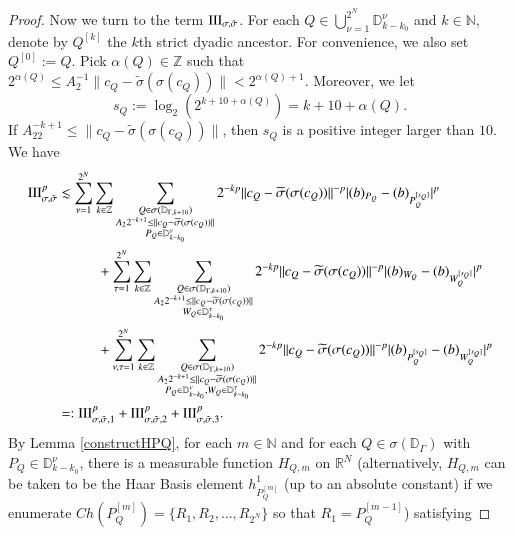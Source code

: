 \documentclass[12pt]{amsart}
\begin{document}
\begin{proof}
Now we turn to the term ${\rm III}_{\sigma,\tilde{\sigma}}$. For each ${\displaystyle Q\in \bigcup_{\nu=1}^{2^N}\mathbb{D}_{k-k_0}^\nu}$ and $k\in\mathbb{N}$, denote by $Q^{[k]}$ the $k$th strict dyadic ancestor. For convenience, we also set $Q^{[0]}:=Q$.  Pick $\alpha(Q)\in\mathbb{Z}$ such that
$2^{\alpha(Q)}\leq A_2^{-1}\|c_Q-\widetilde{\sigma}(\sigma(c_Q))\|<2^{\alpha(Q)+1}.$ Moreover, we let
$$s_Q:=\log_2(2^{k+10+\alpha(Q)})=k+10+\alpha(Q).$$
If $A_22^{-k+1}\leq \|c_Q-\widetilde{\sigma}(\sigma(c_Q))\|$, then $s_Q$ is a positive integer larger than $10$. We have
\begin{align*}
{\rm III}_{\sigma,\tilde{\sigma}}^p
&\lesssim \sum_{\nu=1}^{2^N}\sum_{k\in\mathbb{Z}}\sum_{\substack{Q\in\sigma(\mathbb{D}_{\Gamma,k+10})\nonumber\\ A_22^{-k+1}\leq \|c_Q-\widetilde{\sigma}(\sigma(c_Q))\|\\ P_Q\in\mathbb{D}_{k-k_0}^\nu}}2^{-kp}\|c_Q-\widetilde{\sigma}(\sigma(c_Q))\|^{-p}|(b)_{P_Q}-(b)_{P_Q^{[s_Q]}}|^p\nonumber\\
&\hspace{1.0cm}+ \sum_{\tau=1}^{2^N}\sum_{k\in\mathbb{Z}}\sum_{\substack{Q\in\sigma(\mathbb{D}_{\Gamma,k+10})\nonumber\\ A_22^{-k+1}\leq \|c_Q-\widetilde{\sigma}(\sigma(c_Q))\|\\ W_Q\in\mathbb{D}_{k-k_0}^\tau}}2^{-kp}\|c_Q-\widetilde{\sigma}(\sigma(c_Q))\|^{-p}|(b)_{W_Q}-(b)_{W_Q^{[s_Q]}}|^p\nonumber\\
&\hspace{1.0cm}+\sum_{\nu,\tau=1}^{2^N}\sum_{k\in\mathbb{Z}}\sum_{\substack{Q\in\sigma(\mathbb{D}_{\Gamma,k+10})\nonumber\\ A_22^{-k+1}\leq \|c_Q-\widetilde{\sigma}(\sigma(c_Q))\|\\ P_Q\in\mathbb{D}_{k-k_0}^\nu,W_Q\in\mathbb{D}_{k-k_0}^\tau }}2^{-kp}\|c_Q-\widetilde{\sigma}(\sigma(c_Q))\|^{-p}|(b)_{P_Q^{[s_Q]}}-(b)_{W_Q^{[s_Q]}}|^p\nonumber\\
&=:{\rm III}_{\sigma,\tilde{\sigma},1}^p+{\rm III}_{\sigma,\tilde{\sigma},2}^p+{\rm III}_{\sigma,\tilde{\sigma},3}^p.
\end{align*}
By Lemma \ref{constructHPQ}, for each $m\in\mathbb{N}$ and for each $Q\in\sigma(\mathbb{D}_{\Gamma})$ with $P_Q\in\mathbb{D}_{k-k_0}^\nu$, there is a measurable function $H_{Q,m}$ on $\mathbb{R}^N$ (alternatively, $H_{Q,m}$ can be taken to be the Haar Basis element $h_{P_Q^{[m]}}^1$ (up to an absolute constant) if we enumerate $Ch(P_Q^{[m]})=\{R_1,R_2,\ldots,R_{2^N}\}$ so that $R_1=P_Q^{[m-1]}$) satisfying

\end{proof}
\end{document}
